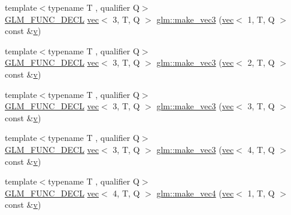 \begin{DoxyCompactItemize}
\item 
{\footnotesize template$<$typename T , qualifier Q$>$ }\\\mbox{\hyperlink{setup_8hpp_ab2d052de21a70539923e9bcbf6e83a51}{G\+L\+M\+\_\+\+F\+U\+N\+C\+\_\+\+D\+E\+CL}} \mbox{\hyperlink{structglm_1_1vec}{vec}}$<$ 3, T, Q $>$ \mbox{\hyperlink{group__gtc__type__ptr_ga9147e4b3a5d0f4772edfbfd179d7ea0b}{glm\+::make\+\_\+vec3}} (\mbox{\hyperlink{structglm_1_1vec}{vec}}$<$ 1, T, Q $>$ const \&\mbox{\hyperlink{_s_d_l__opengl_8h_a10a82eabcb59d2fcd74acee063775f90}{v}})
\item 
{\footnotesize template$<$typename T , qualifier Q$>$ }\\\mbox{\hyperlink{setup_8hpp_ab2d052de21a70539923e9bcbf6e83a51}{G\+L\+M\+\_\+\+F\+U\+N\+C\+\_\+\+D\+E\+CL}} \mbox{\hyperlink{structglm_1_1vec}{vec}}$<$ 3, T, Q $>$ \mbox{\hyperlink{group__gtc__type__ptr_ga482b60a842a5b154d3eed392417a9511}{glm\+::make\+\_\+vec3}} (\mbox{\hyperlink{structglm_1_1vec}{vec}}$<$ 2, T, Q $>$ const \&\mbox{\hyperlink{_s_d_l__opengl_8h_a10a82eabcb59d2fcd74acee063775f90}{v}})
\item 
{\footnotesize template$<$typename T , qualifier Q$>$ }\\\mbox{\hyperlink{setup_8hpp_ab2d052de21a70539923e9bcbf6e83a51}{G\+L\+M\+\_\+\+F\+U\+N\+C\+\_\+\+D\+E\+CL}} \mbox{\hyperlink{structglm_1_1vec}{vec}}$<$ 3, T, Q $>$ \mbox{\hyperlink{group__gtc__type__ptr_gacd57046034df557b8b1c457f58613623}{glm\+::make\+\_\+vec3}} (\mbox{\hyperlink{structglm_1_1vec}{vec}}$<$ 3, T, Q $>$ const \&\mbox{\hyperlink{_s_d_l__opengl_8h_a10a82eabcb59d2fcd74acee063775f90}{v}})
\item 
{\footnotesize template$<$typename T , qualifier Q$>$ }\\\mbox{\hyperlink{setup_8hpp_ab2d052de21a70539923e9bcbf6e83a51}{G\+L\+M\+\_\+\+F\+U\+N\+C\+\_\+\+D\+E\+CL}} \mbox{\hyperlink{structglm_1_1vec}{vec}}$<$ 3, T, Q $>$ \mbox{\hyperlink{group__gtc__type__ptr_ga8b589ed7d41a298b516d2a69169248f1}{glm\+::make\+\_\+vec3}} (\mbox{\hyperlink{structglm_1_1vec}{vec}}$<$ 4, T, Q $>$ const \&\mbox{\hyperlink{_s_d_l__opengl_8h_a10a82eabcb59d2fcd74acee063775f90}{v}})
\item 
{\footnotesize template$<$typename T , qualifier Q$>$ }\\\mbox{\hyperlink{setup_8hpp_ab2d052de21a70539923e9bcbf6e83a51}{G\+L\+M\+\_\+\+F\+U\+N\+C\+\_\+\+D\+E\+CL}} \mbox{\hyperlink{structglm_1_1vec}{vec}}$<$ 4, T, Q $>$ \mbox{\hyperlink{group__gtc__type__ptr_ga600cb97f70c5d50d3a4a145e1cafbf37}{glm\+::make\+\_\+vec4}} (\mbox{\hyperlink{structglm_1_1vec}{vec}}$<$ 1, T, Q $>$ const \&\mbox{\hyperlink{_s_d_l__opengl_8h_a10a82eabcb59d2fcd74acee063775f90}{v}})

\end{DoxyCompactItemize}
